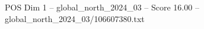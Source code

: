 \begin{textsample}{POS Dim 1 – global\_north\_2024\_03 – Score 16.00 – global\_north\_2024\_03/106607380.txt}
\end{textsample}
